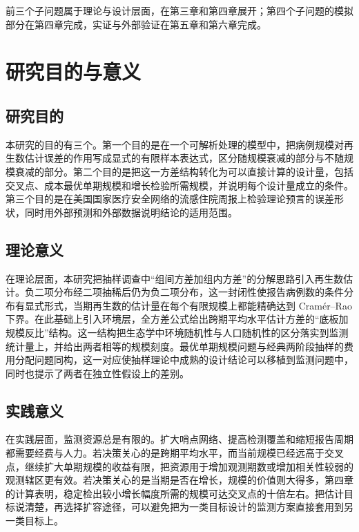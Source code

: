 前三个子问题属于理论与设计层面，在第三章和第四章展开；第四个子问题的模拟部分在第四章完成，实证与外部验证在第五章和第六章完成。

\section{研究目的与意义}
\label{sec:intro-significance}

\subsection{研究目的}

本研究的目的有三个。第一个目的是在一个可解析处理的模型中，把病例规模对再生数估计误差的作用写成显式的有限样本表达式，区分随规模衰减的部分与不随规模衰减的部分。第二个目的是把这一方差结构转化为可以直接计算的设计量，包括交叉点、成本最优单期规模和增长检验所需规模，并说明每个设计量成立的条件。第三个目的是在美国国家医疗安全网络的流感住院周报上检验理论预言的误差形状，同时用外部预测和外部数据说明结论的适用范围。

\subsection{理论意义}

在理论层面，本研究把抽样调查中“组间方差加组内方差”的分解思路引入再生数估计。负二项分布经二项抽稀后仍为负二项分布，这一封闭性使报告病例数的条件分布有显式形式，当期再生数的估计量在每个有限规模上都能精确达到 Cramér--Rao 下界\citep{lehmann1998point, casella2002statistical}。在此基础上引入环境层，全方差公式给出跨期平均水平估计方差的“底板加规模反比”结构。这一结构把生态学中环境随机性与人口随机性的区分\citep{engen1998demographic}落实到监测统计量上，并给出两者相等的规模刻度。最优单期规模问题与经典两阶段抽样的费用分配问题同构\citep{cochran1977sampling}，这一对应使抽样理论中成熟的设计结论可以移植到监测问题中，同时也提示了两者在独立性假设上的差别。

\subsection{实践意义}

在实践层面，监测资源总是有限的。扩大哨点网络、提高检测覆盖和缩短报告周期都需要经费与人力。若决策关心的是跨期平均水平，而当前规模已经远高于交叉点，继续扩大单期规模的收益有限，把资源用于增加观测期数或增加相关性较弱的观测辖区更有效。若决策关心的是当期是否在增长，规模的价值则大得多，第四章的计算表明，稳定检出较小增长幅度所需的规模可达交叉点的十倍左右。把估计目标说清楚，再选择扩容途径，可以避免把为一类目标设计的监测方案直接套用到另一类目标上。

